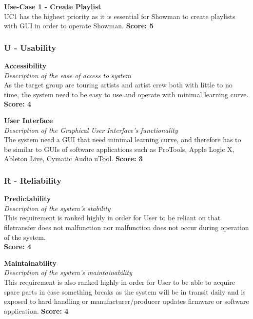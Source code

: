 \textbf{Use-Case 1 - Create Playlist} \\
UC1 has the highest priority as it is essential for Showman to create playlists with GUI in order to operate Showman. \newline
\textbf{Score: 5} \\

\subsubsection{\textbf{U} - Usability} 
\textbf{Accessibility} \\
\textit{Description of the ease of access to system} \\
As the target group are touring artists and artist crew both with little to no time, the system need to be easy to use and operate with minimal learning curve. \newline
\textbf{Score: 4} \newline

\textbf{User Interface} \\
\textit{Description of the Graphical User Interface's functionality} \\
The system need a GUI that need minimal learning curve, and therefore has to be similar to GUIs of software applications such as ProTools, Apple Logic X, Ableton Live, Cymatic Audio uTool. \newline
\textbf{Score: 3}

\subsubsection{\textbf{R} - Reliability} 
\textbf{Predictability} \\
\textit{Description of the system's stability} \\
This requirement is ranked highly in order for User to be reliant on that filetransfer does not malfunction nor malfunction does not occur during operation of the system. \\
\textbf{Score: 4} \newline

\textbf{Maintainability} \\
\textit{Description of the system's maintainability} \\
This requirement is also ranked highly in order for User to be able to acquire spare parts in case something breaks as the system will be in transit daily and is exposed to hard handling or manufacturer/producer updates firmware or software application. \newline
\textbf{Score: 4} \newline

